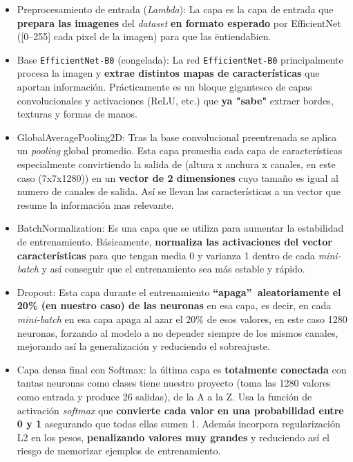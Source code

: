 \begin{itemize}
    \item Preprocesamiento de entrada (\textit{Lambda}): La capa  es la capa de entrada que \textbf{prepara las imagenes} del \textit{dataset} \textbf{en formato esperado} por EfficientNet ([0–255] cada pixel de la imagen) para que las \"entienda\" bien. 

    \item Base \texttt{EfficientNet-B0} (congelada): La red \texttt{EfficientNet-B0} principalmente procesa la imagen y \textbf{extrae distintos mapas de características} que aportan información. Prácticamente es un bloque gigantesco de capas convolucionales y activaciones (ReLU, etc.) que \textbf{ya "sabe"} extraer bordes, texturas y formas de manos. 

    \item GlobalAveragePooling2D: Tras la base convolucional preentrenada se aplica un \textit{pooling} global promedio. Esta capa promedia cada capa de características especialmente convirtiendo la salida de (altura x anchura x canales, en este caso (7x7x1280)) en un \textbf{vector de 2 dimensiones} cuyo tamaño es igual al numero de canales de salida. Así se llevan las características a un vector que resume la información mas relevante.

    \item BatchNormalization: Es una capa que se utiliza para aumentar la estabilidad de entrenamiento. Básicamente, \textbf{normaliza las activaciones del vector características} para que tengan media 0 y varianza 1 dentro de cada \textit{mini-batch} y así conseguir que el entrenamiento sea más estable y rápido.


    \item Dropout: Esta capa durante el entrenamiento \textbf{``apaga''\ aleatoriamente el 20\% (en nuestro caso) de las neuronas} en esa capa, es decir, en cada \textit{mini-batch} en esa capa apaga al azar el 20\% de esos valores, en este caso 1280 neuronas, forzando al modelo a no depender siempre de los mismos canales, mejorando así la generalización y reduciendo el sobreajuste.

    \item Capa densa final con Softmax: la última capa es \textbf{totalmente conectada} con tantas neuronas como clases tiene nuestro proyecto (toma las 1280 valores como entrada y produce 26 salidas), de la A a la Z. Usa la función de activación \textit{softmax} que \textbf{convierte cada valor en una probabilidad entre 0 y 1} asegurando que todas ellas sumen 1. Además incorpora regularización L2 en los pesos, \textbf{penalizando valores muy grandes} y reduciendo así el riesgo de memorizar ejemplos de entrenamiento.

\end{itemize}

